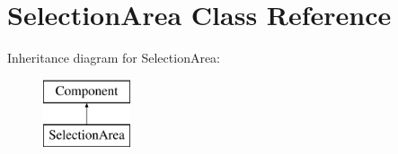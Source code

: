 \hypertarget{class_selection_area}{\section{Selection\-Area Class Reference}
\label{class_selection_area}
}
Inheritance diagram for Selection\-Area\-:\begin{figure}[H]
\begin{center}
\leavevmode
\includegraphics[height=2.000000cm]{class_selection_area}
\end{center}
\end{figure}
